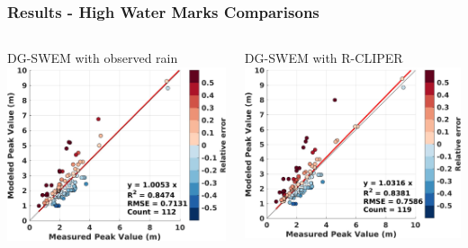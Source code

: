 \documentclass[10pt]{oden_beamer}
\begin{document}
\begin{frame}
  \frametitle{Results - High Water Marks Comparisons}
  \begin{columns}
    \centering
    \vspace{0.5cm}
    \centering
    DG-SWEM with observed rain
    \includegraphics[width=\linewidth]{2008_owi.jpg}

    \centering
    \vspace{0.5cm}
    \centering
    DG-SWEM with R-CLIPER
    \includegraphics[width=\linewidth]{2008_rain.jpg}

  \end{columns}
\end{frame}
\end{document}
